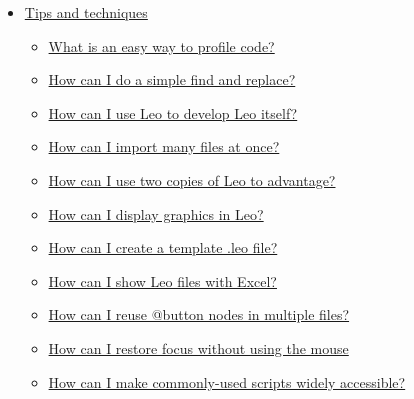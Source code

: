\documentclass[a4paper,10pt,english]{sphinxmanual}
\begin{document}
{\begin{minipage}{0.95\linewidth}
\begin{itemize}
\begin{itemize}
\begin{itemize}
\item {} 
{\hyperref[FAQ:how-do-i-specify-qt-fonts]{How do I specify qt fonts?}}

\item {} 
{\hyperref[FAQ:how-do-i-set-selection-colors]{How do I set selection colors?}}

\end{itemize}

\item {} 
{\hyperref[FAQ:tips-and-techniques]{Tips and techniques}}
\begin{itemize}
\item {} 
{\hyperref[FAQ:what-is-an-easy-way-to-profile-code]{What is an easy way to profile code?}}

\item {} 
{\hyperref[FAQ:how-can-i-do-a-simple-find-and-replace]{How can I do a simple find and replace?}}

\item {} 
{\hyperref[FAQ:how-can-i-use-leo-to-develop-leo-itself]{How can I use Leo to develop Leo itself?}}

\item {} 
{\hyperref[FAQ:how-can-i-import-many-files-at-once]{How can I import many files at once?}}

\item {} 
{\hyperref[FAQ:how-can-i-use-two-copies-of-leo-to-advantage]{How can I use two copies of Leo to advantage?}}

\item {} 
{\hyperref[FAQ:how-can-i-display-graphics-in-leo]{How can I display graphics in Leo?}}

\item {} 
{\hyperref[FAQ:how-can-i-create-a-template-leo-file]{How can I create a template .leo file?}}

\item {} 
{\hyperref[FAQ:how-can-i-show-leo-files-with-excel]{How can I show Leo files with Excel?}}

\item {} 
{\hyperref[FAQ:how-can-i-reuse-button-nodes-in-multiple-files]{How can I reuse @button nodes in multiple files?}}

\item {} 
{\hyperref[FAQ:how-can-i-restore-focus-without-using-the-mouse]{How can I restore focus without using the mouse}}

\item {} 
{\hyperref[FAQ:how-can-i-make-commonly-used-scripts-widely-accessible]{How can I make commonly-used scripts widely accessible?}}


\end{itemize}
\end{itemize}
\end{itemize}
\end{minipage}}
\end{document}
